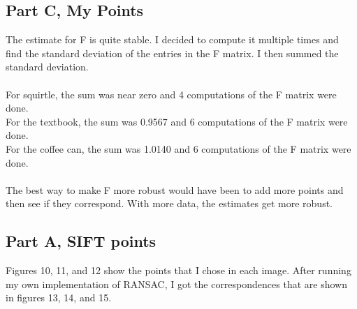 \documentclass[11pt,psfig]{article}
\begin{document}
\newpage

\subsection*{Part C, My Points}

The estimate for F is quite stable. I decided to compute it multiple times and find the standard deviation of the entries in the F matrix. I then summed the standard deviation. \\
\\
For squirtle, the sum was near zero and 4 computations of the F matrix were done.\\
For the textbook, the sum was 0.9567 and 6 computations of the F matrix were done.\\
For the coffee can, the sum was 1.0140 and 6 computations of the F matrix were done. \\
\\
The best way to make F more robust would have been to add more points and then see if they correspond. With more data, the estimates get more robust. 

\subsection*{Part A, SIFT points}

Figures 10, 11, and 12 show the points that I chose in each image. After running my own implementation of RANSAC, I got the correspondences that are shown in figures 13, 14, and 15.
\end{document}
